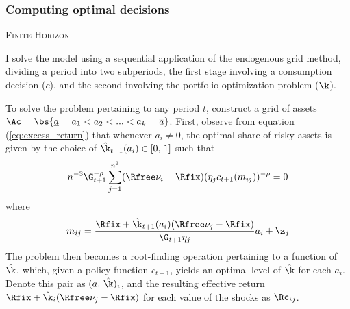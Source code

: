 \subsubsection{Computing optimal decisions}

\textsc{Finite-Horizon}

I solve the model using a sequential application of the endogenous grid method, dividing a period into two subperiods, the first stage involving a consumption decision ($c$), and the second involving the portfolio optimization problem ($\k$).

To solve the problem pertaining to any period $t$, construct a grid of assets $\Ac = \bs{\underline{a} = a_1 < a_2 < ... < a_k = \overline{a}}$. First, observe from equation (\ref{eq:excess_return}) that whenever $a_i \neq 0$, the optimal share of risky assets is given by the choice of $\hat{\k}_{t+1}(a_i) \in [0,\,1]$ such that
\begin{equation}\label{eq:kappa}
n^{-3}\G_{t+1}^{-\rho}\sum_{j=1}^{n^3}(\Rfree\nu_i - \Rfix)(\eta_{j}c_{t+1}(m_{ij}))^{-\rho} = 0
\end{equation}
where
\[
m_{ij} = \frac{\Rfix + \hat{\k}_{t+1}(a_i)(\Rfree\nu_j - \Rfix)}{\G_{t+1}\eta_{j}}a_i + \z_j
\]
The problem then becomes a root-finding operation pertaining to a function of $\hat{\k}$, which, given a policy function $c_{t+1}$, yields an optimal level of $\hat{\k}$ for each $a_i$. Denote this pair as $(a,\,\hat{\k})_{i}$, and the resulting effective return $\Rfix + \hat{\k}_{i}(\Rfree\nu_{j} - \Rfix)$ for each value of the shocks as $\Rc_{ij}$.


